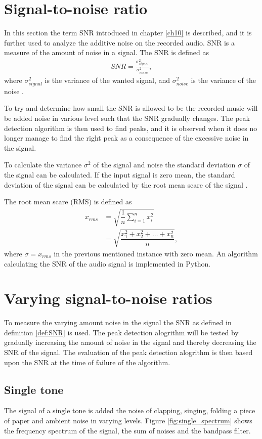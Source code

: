 \section{Signal-to-noise ratio}
In this section the term SNR introduced in chapter \ref{ch10} is described, and it is further used to analyze the additive noise on the recorded audio.
SNR is a measure of the amount of noise in a signal. 
The SNR is defined as
\begin{align} \label{eq:SNR}
	SNR=\frac{\sigma_{signal}^2}{\sigma_{noise}^2},
\end{align}
where $\sigma_{signal}^2$ is the variance of the wanted signal, and $\sigma_{noise}^2$ is the variance of the noise \cite{page 228, DTSP}.

To try and determine how small the SNR is allowed to be the recorded music will be added noise in various level such that the SNR gradually changes.
The peak detection algorithm is then used to find peaks, and it is observed when it does no longer manage to find the right peak as a consequence of the excessive noise in the signal.

To calculate the variance $\sigma^2$ of the signal and noise the standard deviation $\sigma$ of the signal can be calculated. 
If the input signal is zero mean, the standard deviation of the signal can be calculated by the root mean scare of the signal \cite{page 228, DTSP}.

The root mean scare (RMS) is defined as
\begin{align*}
	x_{rms} 
	&=\sqrt{\dfrac{1}{n} \sum_{i=1}^n x_i^2}\\
	&= \sqrt{\dfrac{x_1^2 + x_2^2 + \dots + x_n^2}{n}},
\end{align*}
where $\sigma = x_{rms}$ in the previous mentioned instance with zero mean. An algorithm calculating the SNR of the audio signal is implemented in Python.

\section{Varying signal-to-noise ratios}
To measure the varying amount noise in the signal the SNR as defined in definition \ref{def:SNR} is used. The peak detection alogrithm will be tested by gradually increasing the amount of noise in the signal and thereby decreasing the SNR of the signal. The evaluation of the peak detection alogrithm is then based upon the SNR at the time of failure of the algorithm.

\subsection{Single tone}
The signal of a single tone is added the noise of clapping, singing, folding a piece of paper and ambient noise in varying levels. Figure \ref{fig:single_spectrum} shows the frequency spectrum of the signal, the sum of noises and the bandpass filter.

